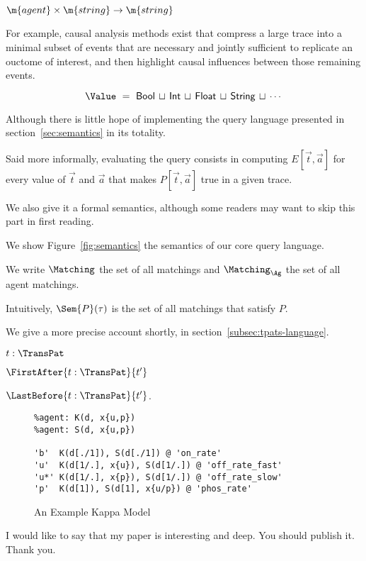 $\m{agent} \times \m{string} \to \m{string}$

For example, causal analysis methods exist
\cite{DanosEtAl-CONCUR07,DBLP:conf/fsttcs/DanosFFHH12} that compress a
large trace into a minimal subset of events that are necessary and
jointly sufficient to replicate an ouctome of interest, and then
highlight causal influences between those remaining events.

\[ \Value \ = \ \textsf{Bool} \,\sqcup\, \textsf{Int} \,\sqcup\,
  \textsf{Float} \,\sqcup\, \textsf{String} \,\sqcup\, \cdots \]


Although there is little hope of implementing the query language
presented in section~\ref{sec:semantics} in its totality.

Said more informally, evaluating the query consists in
computing $E[\Vec{t}, \Vec{a}]$ for every value of $\Vec{t}$ and $\Vec{a}$
that makes $P[\Vec{t}, \Vec{a}]$ true in a given trace.

We also give it a formal semantics, although some
readers may want to skip this part in first reading.

We show Figure~\ref{fig:semantics} the semantics of our core query
language.

We write $\Matching$
the set of all matchings and $\Matching_{\Ag}$ the set of all agent matchings.

 Intuitively, $\Sem{P}(\tau)$ is 
the set of all matchings that satisfy $P$.

 We give a more precise
 account shortly, in section~\ref{subsec:tpats-language}.

 \begin{inparaenum}[(i)]
   \item $t:\TransPat$
   \item $\FirstAfter{t:\TransPat}{t'}$
   \item $\LastBefore{t:\TransPat}{t'}$.
 \end{inparaenum}

\begin{figure}
\begin{small}
\begin{verbatim}
%agent: K(d, x{u,p})
%agent: S(d, x{u,p})

'b'  K(d[./1]), S(d[./1]) @ 'on_rate'
'u'  K(d[1/.], x{u}), S(d[1/.]) @ 'off_rate_fast'
'u*' K(d[1/.], x{p}), S(d[1/.]) @ 'off_rate_slow'
'p'  K(d[1]), S(d[1], x{u/p}) @ 'phos_rate'
\end{verbatim}
\end{small}
\caption{An Example Kappa Model}\label{fig:model}
\end{figure}

I would like to say that my paper is interesting and deep. You should
publish it. Thank you.
